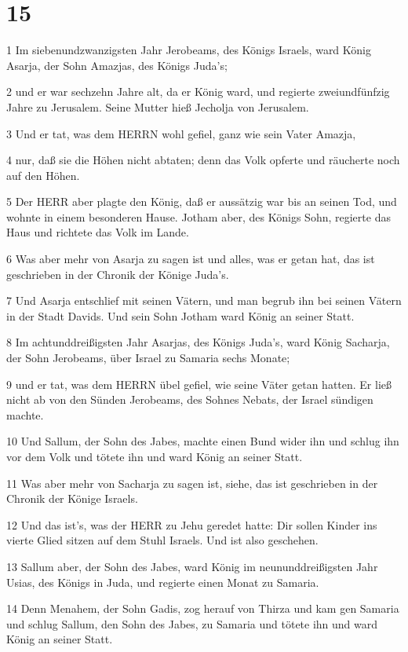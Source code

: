 \chapter{15}

\par 1 Im siebenundzwanzigsten Jahr Jerobeams, des Königs Israels, ward König Asarja, der Sohn Amazjas, des Königs Juda's;
\par 2 und er war sechzehn Jahre alt, da er König ward, und regierte zweiundfünfzig Jahre zu Jerusalem. Seine Mutter hieß Jecholja von Jerusalem.
\par 3 Und er tat, was dem HERRN wohl gefiel, ganz wie sein Vater Amazja,
\par 4 nur, daß sie die Höhen nicht abtaten; denn das Volk opferte und räucherte noch auf den Höhen.
\par 5 Der HERR aber plagte den König, daß er aussätzig war bis an seinen Tod, und wohnte in einem besonderen Hause. Jotham aber, des Königs Sohn, regierte das Haus und richtete das Volk im Lande.
\par 6 Was aber mehr von Asarja zu sagen ist und alles, was er getan hat, das ist geschrieben in der Chronik der Könige Juda's.
\par 7 Und Asarja entschlief mit seinen Vätern, und man begrub ihn bei seinen Vätern in der Stadt Davids. Und sein Sohn Jotham ward König an seiner Statt.
\par 8 Im achtunddreißigsten Jahr Asarjas, des Königs Juda's, ward König Sacharja, der Sohn Jerobeams, über Israel zu Samaria sechs Monate;
\par 9 und er tat, was dem HERRN übel gefiel, wie seine Väter getan hatten. Er ließ nicht ab von den Sünden Jerobeams, des Sohnes Nebats, der Israel sündigen machte.
\par 10 Und Sallum, der Sohn des Jabes, machte einen Bund wider ihn und schlug ihn vor dem Volk und tötete ihn und ward König an seiner Statt.
\par 11 Was aber mehr von Sacharja zu sagen ist, siehe, das ist geschrieben in der Chronik der Könige Israels.
\par 12 Und das ist's, was der HERR zu Jehu geredet hatte: Dir sollen Kinder ins vierte Glied sitzen auf dem Stuhl Israels. Und ist also geschehen.
\par 13 Sallum aber, der Sohn des Jabes, ward König im neununddreißigsten Jahr Usias, des Königs in Juda, und regierte einen Monat zu Samaria.
\par 14 Denn Menahem, der Sohn Gadis, zog herauf von Thirza und kam gen Samaria und schlug Sallum, den Sohn des Jabes, zu Samaria und tötete ihn und ward König an seiner Statt.
